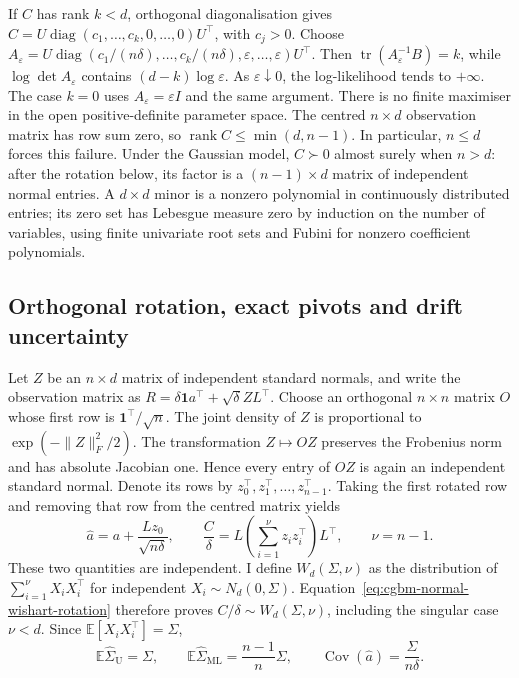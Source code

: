 \documentclass[11pt]{article}
\begin{document}
If $C$ has rank $k<d$, orthogonal diagonalisation gives
$C=U\operatorname{diag}(c_1,\ldots,c_k,0,\ldots,0)U^\top$, with
$c_j>0$. Choose
$A_\varepsilon=U\operatorname{diag}(c_1/(n\delta),\ldots,
c_k/(n\delta),\varepsilon,\ldots,\varepsilon)U^\top$.
Then $\operatorname{tr}(A_\varepsilon^{-1}B)=k$, while
$\log\det A_\varepsilon$ contains $(d-k)\log\varepsilon$.
As $\varepsilon\downarrow0$, the log-likelihood tends to $+\infty$.
The case $k=0$ uses $A_\varepsilon=\varepsilon I$ and the same argument.
There is no finite maximiser in the open positive-definite parameter
space. The centred $n\times d$ observation matrix has row sum zero,
so $\operatorname{rank}C\leq\min(d,n-1)$. In particular, $n\leq d$
forces this failure. Under the Gaussian model, $C\succ0$ almost surely
when $n>d$: after the rotation below, its factor is a
$(n-1)\times d$ matrix of independent normal entries. A $d\times d$
minor is a nonzero polynomial in continuously distributed entries;
its zero set has Lebesgue measure zero by induction on the number of
variables, using finite univariate root sets and Fubini for nonzero
coefficient polynomials.

\subsection{Orthogonal rotation, exact pivots and drift uncertainty}

Let $Z$ be an $n\times d$ matrix of independent standard normals, and
write the observation matrix as
$R=\delta\mathbf1 a^\top+\sqrt\delta ZL^\top$.
Choose an orthogonal $n\times n$ matrix $O$ whose first row is
$\mathbf1^\top/\sqrt n$. The joint density of $Z$ is proportional to
$\exp(-\|Z\|_F^2/2)$. The transformation $Z\mapsto OZ$ preserves
the Frobenius norm and has absolute Jacobian one. Hence every entry
of $OZ$ is again an independent standard normal. Denote its rows by
$z_0^\top,z_1^\top,\ldots,z_{n-1}^\top$. Taking the first rotated
row and removing that row from the centred matrix yields
\begin{equation}
 \widehat a=a+\frac{Lz_0}{\sqrt{n\delta}},\qquad
 \frac C\delta=L\left(\sum_{i=1}^{\nu}z_i z_i^\top\right)L^\top,
 \qquad \nu=n-1.
 \label{eq:cgbm-normal-wishart-rotation}
\end{equation}
These two quantities are independent. I define
$W_d(\Sigma,\nu)$ as the distribution of
$\sum_{i=1}^{\nu}X_iX_i^\top$ for independent
$X_i\sim N_d(0,\Sigma)$. Equation~\eqref{eq:cgbm-normal-wishart-rotation}
therefore proves $C/\delta\sim W_d(\Sigma,\nu)$, including the singular
case $\nu<d$. Since $\mathbb E[X_iX_i^\top]=\Sigma$,
\begin{equation}
 \mathbb E\widehat\Sigma_{\mathrm U}=\Sigma,
 \qquad \mathbb E\widehat\Sigma_{\mathrm{ML}}=
 \frac{n-1}{n}\Sigma,
 \qquad \operatorname{Cov}(\widehat a)=\frac{\Sigma}{n\delta}.
 \label{eq:cgbm-estimator-moments}
\end{equation}
\end{document}
